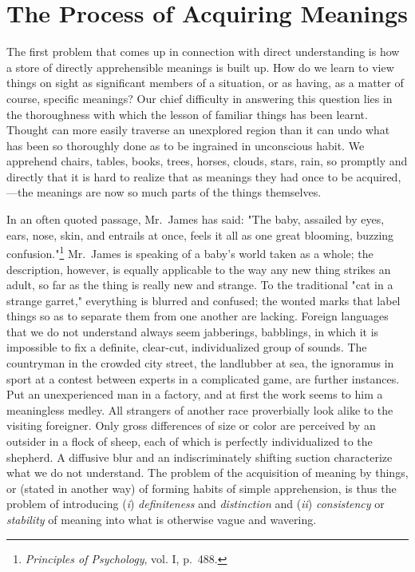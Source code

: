 \documentclass[showtrims,ustradepaper]{memoir}
\begin{document}
\section*{The Process of Acquiring Meanings}


The first problem that comes up in connection with direct understanding
is how a store of directly
apprehensible
meanings is built up. How do we learn to view things on sight as
significant members of a situation, or as having, as a matter of course,
specific meanings? Our chief difficulty in answering this question lies
in the thoroughness with which the lesson of familiar things has been
learnt. Thought can more easily traverse an unexplored region than it
can undo what has been so thoroughly done as to be ingrained in
unconscious habit. We apprehend chairs, tables, books, trees, horses,
clouds, stars, rain, so promptly and directly that it is hard to realize
that as meanings they had once to be acquired,---the meanings are now so
much parts of the things themselves.


In an often quoted passage, Mr.\ James has said: "The baby, assailed by
eyes, ears, nose, skin, and entrails at once, feels it all as one great
blooming, buzzing
confusion."\footnote{
\emph{Principles of Psychology}, vol. I, p.\ 488.
}
Mr.\ James is speaking of a baby's world taken as a whole; the
description, however, is equally applicable to the way any new thing
strikes an adult, so far as the thing is really new and strange. To the
traditional "cat in a strange garret," everything is blurred and
confused; the wonted marks that label things so as to separate them from
one another are lacking. Foreign languages that we do not understand
always seem jabberings, babblings, in which it is impossible to fix a
definite, clear-cut, individualized group of sounds. The countryman in
the crowded city street, the landlubber at sea, the ignoramus in sport
at a contest between experts in a complicated game, are further
instances. Put an unexperienced man in a factory, and at first the work
seems to him a meaningless medley. All strangers of another race
proverbially look alike to the
visiting
foreigner. Only gross differences of size or color are perceived by an
outsider in a flock of sheep, each of which is perfectly individualized
to the shepherd. A diffusive blur and an indiscriminately shifting
suction characterize what we do not understand. The problem of the
acquisition of meaning by things, or (stated in another way) of forming
habits of simple apprehension, is thus the problem of introducing
(\emph{i}) \emph{definiteness} and \emph{distinction} and (\emph{ii})
\emph{consistency} or \emph{stability} of meaning into what is otherwise
vague and wavering.
\end{document}
